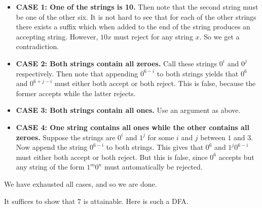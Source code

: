 \documentclass[11pt]{article}
\newcounter{enum}
\begin{document}
\begin{enumerate}
\begin{itemize}

\item\textbf{CASE 1: One of the strings is 10.}  Then note that the second string must be one of the other six.  It is not hard to see that for each of the other strings there exists a suffix which when added to the end of the string produces an accepting string.  However, $10x$ must reject for any string $x$.  So we get a contradiction.

\item\textbf{CASE 2: Both strings contain all zeroes.}  Call these strings $0^i$ and $0^j$ respectively.  Then note that appending $0^{6-i}$ to both strings yields that $0^6$ and $0^{6+j-i}$ must either both accept or both reject.  This is false, because the former accepts while the latter rejects.

\item\textbf{CASE 3: Both strings contain all ones.}  Use an argument as above.

\item\textbf{CASE 4: One string contains all ones while the other contains all zeroes.}  Suppose the strings are $0^i$ and $1^j$ for some $i$ and $j$ between $1$ and $3$.  Now append the string $0^{6-i}$ to both strings.  This gives that $0^6$ and $1^j0^{6-i}$ must either both accept or both reject.  But this is false, since $0^6$ accepts but any string of the form $1^m0^n$ must automatically be rejected.

\end{itemize}

We have exhausted all cases, and so we are done.

\par It suffices to show that $7$ is attainable.  Here is such a DFA.

\begin{center}
\end{center}


\end{enumerate}
\end{document}
